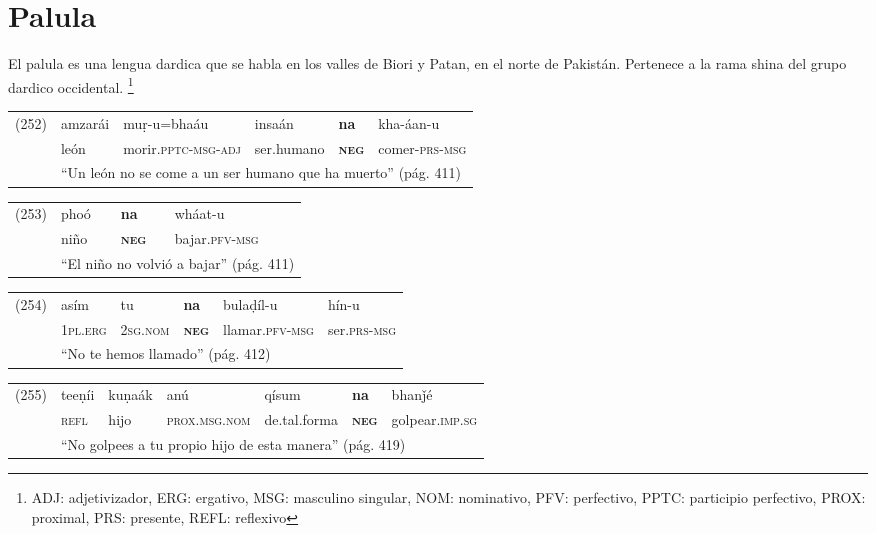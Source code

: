 \section*{Palula}

\noindent El palula es una lengua dardica que se habla en los valles de Biori y Patan, en el norte de Pakistán. Pertenece a la rama shina del grupo dardico occidental.
\footnote{ADJ: adjetivizador, ERG: ergativo, MSG: masculino singular, NOM: nominativo,  PFV: perfectivo, PPTC: participio perfectivo, PROX: proximal, PRS: presente, REFL: reflexivo}
\vspace{0.5cm}

{\setmainfont{Charis SIL} 

\begin{tabular}{llllll}
(252) & amzarái & muṛ-u=bhaáu & insaán & \textbf{na} & kha-áan-u \\
& león & morir.\textsc{pptc-msg-adj} & ser.humano & \textsc{\textbf{neg}} & comer-\textsc{prs-msg} \\
& \multicolumn{5}{l}{``Un león no se come a un ser humano que ha muerto'' (pág. 411)}
\end{tabular} \vspace{0.5cm}

\begin{tabular}{llll}
(253) & phoó & \textbf{na} & wháat-u \\
& niño & \textsc{\textbf{neg}} & bajar.\textsc{pfv-msg} \\
& \multicolumn{3}{l}{``El niño no volvió a bajar'' (pág. 411)}
\end{tabular} \vspace{0.5cm}

\begin{tabular}{llllll}
(254) & asím & tu & \textbf{na} & bulaḍíl-u & hín-u \\
& \textsc{1pl.erg} & \textsc{2sg.nom} & \textsc{\textbf{neg}} & llamar.\textsc{pfv-msg} & ser.\textsc{prs-msg} \\
& \multicolumn{5}{l}{``No te hemos llamado'' (pág. 412)}
\end{tabular} \vspace{0.5cm}

\begin{tabular}{lllllll}
(255) & teeṇíi & kuṇaák & anú & qísum & \textbf{na} & bhanǰé \\
& \textsc{refl} & hijo & \textsc{prox.msg.nom} & de.tal.forma & \textsc{\textbf{neg}} & golpear.\textsc{imp.sg} \\
& \multicolumn{6}{l}{``No golpees a tu propio hijo de esta manera'' (pág. 419)}
\end{tabular} \vspace{0.5cm}

}
